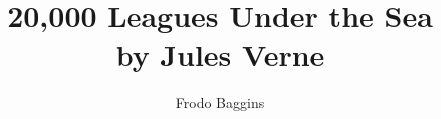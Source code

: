 \documentclass{gatech-thesis}
\title{20,000 Leagues Under the Sea \\ by Jules Verne}
\author{Frodo Baggins}
\begin{document}

%
\begin{preliminary}
\begin{dedication}

\end{dedication}
\begin{acknowledgements}

\end{acknowledgements}
%
\contents
%
\begin{summary}

\end{summary}
\end{preliminary}
%



%
\appendix
%


%
\begin{postliminary}
\begin{vita}

\end{vita}
\end{postliminary}
\end{document}
